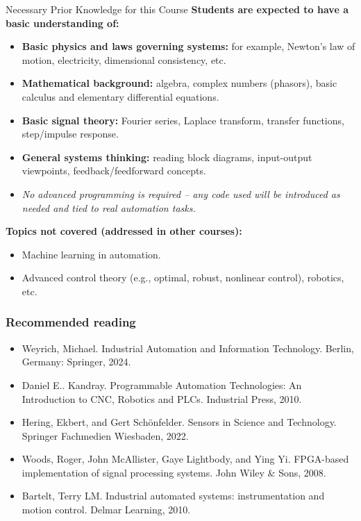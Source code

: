 \begin{frame}{Necessary Prior Knowledge for this Course}
  \textbf{Students are expected to have a basic understanding of:}
  \begin{itemize}
    \item \textbf{Basic physics and laws governing systems:} for example, Newton's law of motion, electricity, dimensional consistency, etc.
    \item \textbf{Mathematical background:} algebra, complex numbers (phasors), basic calculus and elementary differential equations.
    \item \textbf{Basic signal theory:} Fourier series, Laplace transform, transfer functions, step/impulse response.
    \item \textbf{General systems thinking:} reading block diagrams, input-output viewpoints, feedback/feedforward concepts.
    \item \emph{No advanced programming is required -- any code used will be introduced as needed and tied to real automation tasks.}
  \end{itemize}

  \textbf{Topics not covered (addressed in other courses):}
  \begin{itemize}
    \item Machine learning in automation.
    \item Advanced control theory (e.g., optimal, robust, nonlinear control), robotics, etc.
  \end{itemize}
\end{frame}


\begin{frame}
	\frametitle{Recommended reading}
	\begin{itemize}
		\item Weyrich, Michael. Industrial Automation and Information Technology. Berlin, Germany: Springer, 2024.
		\item Daniel E.. Kandray. Programmable Automation Technologies: An Introduction to CNC, Robotics and PLCs. Industrial Press, 2010.
		\item Hering, Ekbert, and Gert Schönfelder. Sensors in Science and Technology. Springer Fachmedien Wiesbaden, 2022.
		\item Woods, Roger, John McAllister, Gaye Lightbody, and Ying Yi. FPGA-based implementation of signal processing systems. John Wiley \& Sons, 2008.
		\item Bartelt, Terry LM. Industrial automated systems: instrumentation and motion control. Delmar Learning, 2010.
	\end{itemize}
\end{frame}